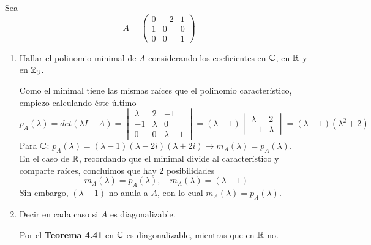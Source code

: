 \item Sea \[A=\begin{pmatrix}
        0&-2&1\\1&0&0\\0&0&1
    \end{pmatrix}\]
    \begin{enumerate}
        \item Hallar el polinomio minimal de $A$ considerando los coeficientes en $\mathbb{C}$, en $\mathbb{R}$ y en $\mathbb{Z}_3$.\pagebreak
            \begin{mdframed}[style=s]
                Como el minimal tiene las mismas raíces que el polinomio característico, empiezo calculando éste último
                \[p_A(\lambda)=det(\lambda I-A)=\begin{vmatrix}
                    \lambda&2&-1\\-1&\lambda&0\\0&0&\lambda-1
                \end{vmatrix}=(\lambda-1)\begin{vmatrix}
                    \lambda&2\\-1&\lambda
                \end{vmatrix}=(\lambda-1)(\lambda^2+2)\]
                Para $\mathbb{C}$: $p_A(\lambda)=(\lambda-1)(\lambda-2i)(\lambda+2i)\to m_A(\lambda)=p_A(\lambda)$.\\
                En el caso de $\mathbb{R}$, recordando que el minimal divide al característico y comparte raíces, concluimos que hay 2 posibilidades \[m_A(\lambda)=p_A(\lambda),\quad m_A(\lambda)=(\lambda-1)\]
                Sin embargo, $(\lambda-1)$ no anula a $A$, con lo cual $m_A(\lambda)=p_A(\lambda)$.
            \end{mdframed}
        \item Decir en cada caso si $A$ es diagonalizable.
            \begin{mdframed}[style=s]
                Por el \textbf{Teorema 4.41} en $\mathbb{C}$ es diagonalizable, mientras que en $\mathbb{R}$ no.
            \end{mdframed}
    \end{enumerate}